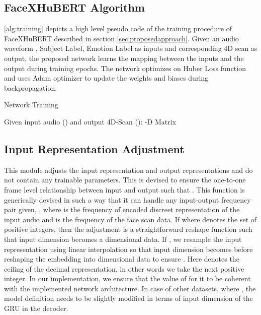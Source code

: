\documentclass[10pt,twocolumn,letterpaper]{article}
\begin{document}
\subsection{FaceXHuBERT Algorithm}
\cref{alg:training} depicts a high level pseudo code of the training procedure of FaceXHuBERT described in section \cref{sec:proposedapproach}. Given an audio waveform , Subject Label, Emotion Label as inputs and corresponding 4D scan  as output, the proposed network learns the mapping between the inputs and the output during training epochs. The network optimizes on Huber Loss function and uses Adam optimizer to update the weights and biases during backpropagation. 

\begin{algorithm}

\caption{Network Training}\label{alg:training}
\begin{algorithmic}
\State Given input audio () and output 4D-Scan ():
\State  {}
\State  \space -D Matrix  
\newline

\State 
\State 
\State 
\State 
\State 
\State 
\State 
\State 
\State 

\end{algorithmic}
\end{algorithm}



\subsection{Input Representation Adjustment}
This module adjusts the input representation and output representations and do not contain any trainable parameters. This is devised to ensure the one-to-one frame level relationship between input  and output  such that . This function is generically devised in such a way that it can handle any input-output frequency pair given, , where  is the frequency of encoded discreet representation of the input audio and  is the frequency of the face scan data. If  where  denotes the set of positive integers, then the adjustment is a straightforward reshape function such that input dimension  becomes a  dimensional data. If , we resample the input representation using linear interpolation so that input dimension  becomes  before reshaping the embedding into  dimensional data to ensure . Here  denotes the ceiling of the decimal representation, in other words we take the next positive integer. In our implementation, we ensure that the value of  for it to be coherent with the implemented network architecture. In case of other datasets, where , the model definition needs to be slightly modified in terms of input dimension of the GRU in the decoder. 
\end{document}
